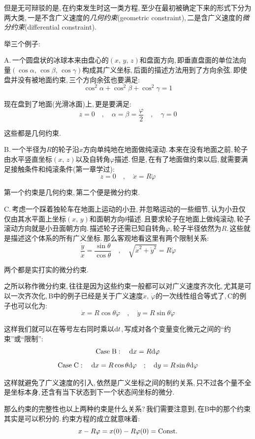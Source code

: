 但是无可辩驳的是,\,在约束发生时这一类方程,\,至少在最初被确定下来的形式下分为两大类,\,一是不含广义速度的\emph{几何约束}(geometric constraint),\,二是含广义速度的\emph{微分约束}(differential constraint).

举三个例子:

A.\,一个圆盘状的冰球本来由盘心的$(x,\,y,\,z)$和盘面方向,\,即垂直盘面的单位法向量$(\cos\alpha,\,\cos\beta,\,\cos\gamma)$构成其广义坐标,\,后面的描述方法用到了方向余弦.\,即使盘并没有被地面约束,\,三个方向余弦也要满足:
\[\cos^2\alpha+\cos^2\beta+\cos^2\gamma=1\]

现在盘到了地面(光滑冰面)上,\,更是要满足:
\[z=0\quad,\quad \alpha=\beta=\frac{\varphi}{2}\quad,\quad \gamma=0\]

这些都是几何约束.

B.\,一个半径为$R$的轮子沿$x$方向单纯地在地面做纯滚动.\,本来在没有地面之前,\,轮子由水平竖直坐标$(x,\,z)$以及自转角$\varphi$描述.\,但是,\,在有了地面做约束以后,\,就需要满足接触条件和纯滚条件(第一章学过):
\[z=0\quad ,\quad \dot{x}=R\dot{\varphi}\]

第一个约束是几何约束,\,第二个便是微分约束.

C.\,考虑一个踩着独轮车在地面上运动的小丑,\,并忽略运动的一些细节,\,认为小丑仅仅由其水平面上坐标$(x,\,y)$和面朝方向$\theta$描述.\,且要求轮子在地面上做纯滚动,\,轮子滚动方向就是小丑面朝方向.\,描述轮子还需已知自转角$\varphi$,\,轮子半径依然为$R$.\,这些就是描述这个体系的所有广义坐标.\,那么客观地看这里有两个限制关系:
\[\frac{\dot{y}}{\dot{x}}=\frac{\sin\theta}{\cos\theta}\quad,\quad \sqrt{\dot{x}^2+\dot{y}^2}=R\dot{\varphi}\]

两个都是实打实的微分约束.

之所以称作微分约束,\,往往是因为这些约束一般都可以对广义速度齐次化,\,尤其是可以一次齐次化,\,B中的例子已经是关于广义速度$\dot{x},\,\dot{\varphi}$的一次线性组合等式了,\,C的例子也可以化为:
\[\dot{x}=R\cos\theta\dot{\varphi}\quad,\quad \dot{y}=R\sin\theta\dot{\varphi}\]

这样我们就可以在等号左右同时乘以$\textrm{d} t$,\,写成对各个变量变化微元之间的``约束''或``限制'':
\[{\rm Case\; B}:\quad \textrm{d} x=R\textrm{d} \varphi\]
\[{\rm Case\; C}:\quad \textrm{d} x=R\cos\theta\textrm{d} \varphi\quad;\quad \textrm{d} y=R\sin\theta\textrm{d} \varphi\]

这样就避免了广义速度的引入,\,依然是广义坐标之间的制约关系,\,只不过各个量不全是坐标本身,\,还含有当下状态到下一个状态间坐标的微分.

那么约束的完整性也以上两种约束是什么关系?\,我们需要注意到,\,在B中的那个约束其实是可以积分的.\,约束方程的成立就意味着:
\[x-R\varphi=x(0)-R\varphi(0)={\rm Const.}\]


